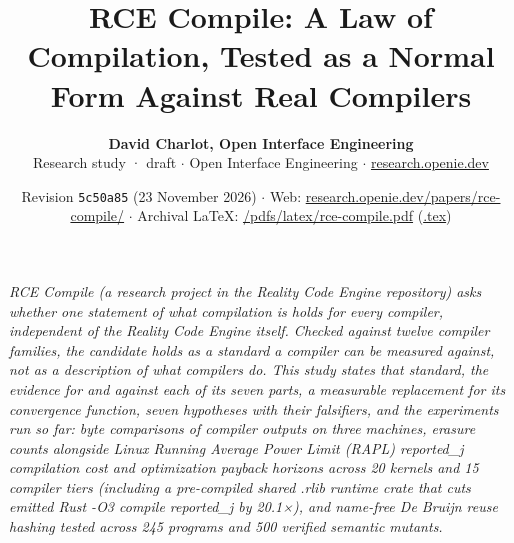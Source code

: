 \documentclass[10pt,letterpaper]{article}
\title{\vspace{-1.2em}\textbf{RCE Compile: A Law of Compilation, Tested as a Normal Form Against Real Compilers}}
\author{\textbf{David Charlot, Open Interface Engineering}\\[0.15em]
{\small Research study · draft $\cdot$ Open Interface Engineering $\cdot$ \href{https://research.openie.dev}{research.openie.dev}}}
\date{\small Revision \texttt{5c50a85} (23 November 2026) $\cdot$ Web: \href{https://research.openie.dev/papers/rce-compile/}{research.openie.dev/papers/rce-compile/} $\cdot$ Archival LaTeX: \href{https://research.openie.dev/pdfs/latex/rce-compile.pdf}{/pdfs/latex/rce-compile.pdf} (\href{https://research.openie.dev/pdfs/latex/rce-compile.tex}{.tex})}
\begin{document}
\maketitle
\vspace{-0.6em}

\noindent{}

\vspace{6pt}
\hspace{8pt}%
\parbox{\dimexpr\linewidth-11pt\relax}{%
  \small\itshape\color{openieSlate}%
  RCE Compile (a research project in the Reality Code Engine repository) asks whether one statement of what compilation is holds for every compiler, independent of the Reality Code Engine itself. Checked against twelve compiler families, the candidate holds as a standard a compiler can be measured against, not as a description of what compilers do. This study states that standard, the evidence for and against each of its seven parts, a measurable replacement for its convergence function, seven hypotheses with their falsifiers, and the experiments run so far: byte comparisons of compiler outputs on three machines, erasure counts alongside Linux Running Average Power Limit (RAPL) reported\_j compilation cost and optimization payback horizons across 20 kernels and 15 compiler tiers (including a pre-compiled shared .rlib runtime crate that cuts emitted Rust -O3 compile reported\_j by 20.1×), and name-free De Bruijn reuse hashing tested across 245 programs and 500 verified semantic mutants.
}
\vspace{6pt}
\end{document}
